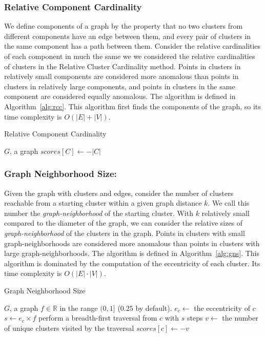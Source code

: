 \subsubsection{Relative Component Cardinality}
We define components of a graph by the property that no two clusters from different components have an edge between them, and every pair of clusters in the same component has a path between them.
Consider the relative cardinalities of each component in much the same we we considered the relative cardinalities of clusters in the Relative Cluster Cardinality method.
Points in clusters in relatively small components are considered more anomalous than points in clusters in relatively large components, and points in clusters in the same component are considered equally anomalous. The algorithm is defined in Algorithm~\ref{alg:rcc}. This algorithm first finds the components of the graph, so its time complexity is $O(|E| + |V|)$.

\begin{algorithm}[h]
    \caption{Relative Component Cardinality}
    \label{alg:rcc}
\begin{algorithmic}[1]
    \Require $G$, a graph
        \State $scores[C] \gets -|C|$
    \EndFor
\end{algorithmic}
\end{algorithm}

\subsubsection{Graph Neighborhood Size:}
Given the graph with clusters and edges, consider the number of clusters reachable from a starting cluster within a given graph distance $k$.
We call this number the \textit{graph-neighborhood} of the starting cluster.
With $k$ relatively small compared to the diameter of the graph, we can consider the relative sizes of \textit{graph-neighborhood} of the clusters in the graph.
Points in clusters with small graph-neighborhoods are considered more anomalous than points in clusters with large graph-neighborhoods. The algorithm is defined in Algorithm~\ref{alg:gns}.
This algorithm is dominated by the computation of the eccentricity of each cluster.
Its time complexity is $O(|E| \cdot |V|)$.


\begin{algorithm}[h]
    \caption{Graph Neighborhood Size}
    \label{alg:gns}
\begin{algorithmic}[1]
    \Require $G$, a graph
    \Require $f \in \mathbb{R}$ in the range $(0,1]$ ($0.25$ by default).
        \State $e_c \gets$ the eccentricity of $c$
        \State $s \gets e_c \times f$
        \State perform a breadth-first traversal from $c$ with $s$ steps
        \State $v \gets$ the number of unique clusters visited by the traversal
        \State $scores[c] \gets -v$
    \EndFor
\end{algorithmic}
\end{algorithm}



